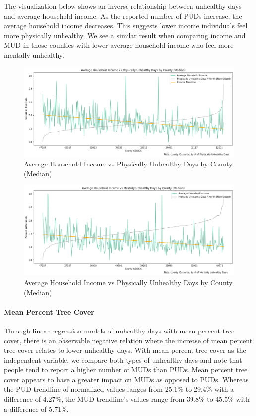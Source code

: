 \documentclass{article}
\begin{document}
The visualization below shows an inverse relationship between unhealthy days and average household income. As the reported number of PUDs increase, the average household income decreases. This suggests lower income individuals feel more physically unhealthy. We see a similar result when comparing income and MUD in those counties with lower average household income who feel more mentally unhealthy.



\begin{figure}[H]
    \centering
    \includegraphics[scale = 0.4]{avg_income_phys.png}
    \caption{Average Household Income vs Physically Unhealthy Days by County (Median)}
    \label{fig:my_label}
\end{figure}

\begin{figure}[H]
    \centering
    \includegraphics[scale = 0.4]{avg_income_mental.png}
    \caption{Average Household Income vs Physically Unhealthy Days by County (Median)}
    \label{fig:my_label}
\end{figure}

\paragraph{Mean Percent Tree Cover}
Through linear regression models of unhealthy days with mean percent tree cover, there is an observable negative relation where the increase of mean percent tree cover relates to lower unhealthy days. With mean percent tree cover as the independent variable, we compare both types of unhealthy days and note that people tend to report a higher number of MUDs than PUDs. Mean percent tree cover appears to have a greater impact on MUDs as opposed to PUDs. Whereas the PUD trendline of normalized values ranges from 25.1\% to 29.4\% with a difference of 4.27\%, the MUD trendline’s values range from 39.8\% to 45.5\% with a difference of 5.71\%.
\end{document}
